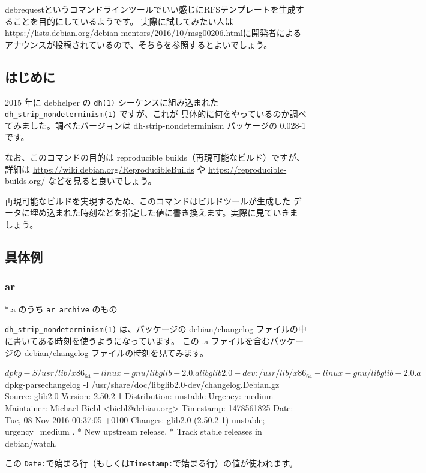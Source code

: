 \documentclass[mingoth,a4paper]{jsarticle}
\begin{document}
debrequestというコマンドラインツールでいい感じにRFSテンプレートを生成することを目的にしているようです。
実際に試してみたい人は\url{https://lists.debian.org/debian-mentors/2016/10/msg00206.html}に開発者によるアナウンスが投稿されているので、そちらを参照するとよいでしょう。

\subsection{はじめに}

2015 年に debhelper の \verb|dh(1)| シーケンスに組み込まれた
\verb|dh_strip_nondeterminism(1)| ですが、これが
具体的に何をやっているのか調べてみました。調べたバージョンは
dh-strip-nondeterminism パッケージの 0.028-1 です。

なお、このコマンドの目的は reproducible builds（再現可能なビルド）ですが、詳細は
\url{https://wiki.debian.org/ReproducibleBuilds} や
\url{https://reproducible-builds.org/} などを見ると良いでしょう。

再現可能なビルドを実現するため、このコマンドはビルドツールが生成した
データに埋め込まれた時刻などを指定した値に書き換えます。実際に見ていきま
しょう。

\subsection{具体例}
\subsubsection{ar}
*.a のうち \verb|ar archive| のもの


\verb|dh_strip_nondeterminism(1)| は、パッケージの debian/changelog
ファイルの中に書いてある時刻を使うようになっています。
この .a ファイルを含むパッケージの debian/changelog ファイルの時刻を見てみます。
\begin{commandline}
$ dpkg -S /usr/lib/x86_64-linux-gnu/libglib-2.0.a
libglib2.0-dev: /usr/lib/x86_64-linux-gnu/libglib-2.0.a
$ dpkg-parsechangelog -l /usr/share/doc/libglib2.0-dev/changelog.Debian.gz
Source: glib2.0
Version: 2.50.2-1
Distribution: unstable
Urgency: medium
Maintainer: Michael Biebl <biebl@debian.org>
Timestamp: 1478561825
Date: Tue, 08 Nov 2016 00:37:05 +0100
Changes:
 glib2.0 (2.50.2-1) unstable; urgency=medium
 .
   * New upstream release.
   * Track stable releases in debian/watch.
\end{commandline}
この \verb|Date:|で始まる行（もしくは\verb|Timestamp:|で始まる行）の値が使われます。
\end{document}
